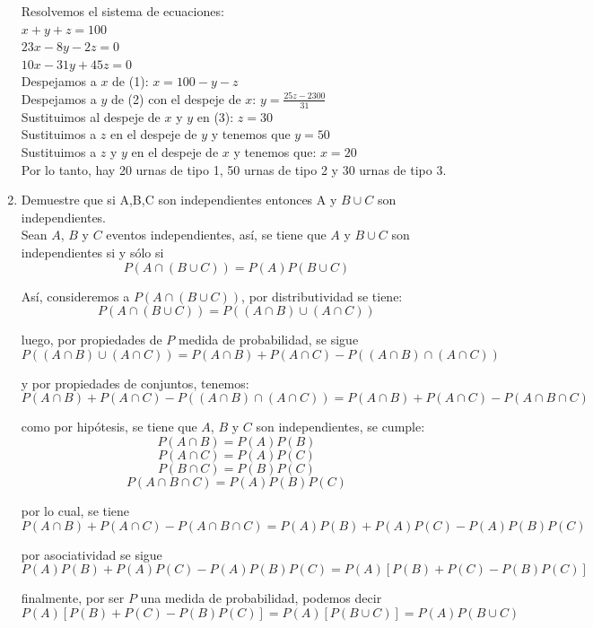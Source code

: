 \documentclass[12pt,a4paper]{report}
\begin{document}
\begin{enumerate}
{Resolvemos el sistema de ecuaciones:\\
$x + y + z = 100$\\
$23x -8y-2z = 0$\\
$10x -31y +45z = 0$\\

Despejamos a $x$ de (1): $ x = 100 -y -z$\\
Despejamos a $y$ de (2) con el despeje de $x$: $ y = \frac{25z -2300}{31}$\\
Sustituimos al despeje de $x$ y $y$ en (3): $z = 30$\\
Sustituimos a $z$ en el despeje de $y$ y tenemos que $y = 50$\\
Sustituimos a $z$ y $y$ en el despeje de $x$ y tenemos que: $x = 20$\\

Por lo tanto, hay 20 urnas de tipo 1, 50 urnas de tipo 2 y 30 urnas de tipo 3.\\

	}

   \item {
   Demuestre que si A,B,C son independientes entonces A y $B\cup C$ son independientes.\\
    Sean $A$, $B$ y  $C$ eventos independientes, así, se tiene que $A$ y $B \cup C$
	son independientes si y sólo si
		$$ P(A\cap(B \cup C)) = P(A)P(B \cup C) $$

	Así, consideremos a $ P(A\cap(B \cup C)) $, por distributividad
	se tiene:
		$$ P(A\cap(B \cup C)) = P((A \cap B) \cup (A \cap C)) $$

	luego, por propiedades de $P$ medida de probabilidad, se sigue
		$$ P((A \cap B) \cup (A \cap C)) = P(A \cap B) + P(A \cap C) - P((A \cap B) \cap (A \cap C)) $$

	y por propiedades de conjuntos, tenemos:
		$$ P(A \cap B) + P(A \cap C) - P((A \cap B) \cap (A \cap C)) = P(A \cap B) + P(A \cap C) - P(A \cap B \cap C) $$

	como por hipótesis, se tiene que $A$, $B$ y $C$ son independientes, se cumple:
		$$ P(A \cap B) = P(A)P(B) $$
		$$ P(A \cap C) = P(A)P(C) $$
		$$ P(B \cap C) = P(B)P(C) $$
		$$ P(A \cap B \cap C) = P(A)P(B)P(C) $$

	por lo cual, se tiene
		$$ P(A \cap B) + P(A \cap C) - P(A \cap B \cap C) = P(A)P(B) + P(A)P(C) - P(A)P(B)P(C) $$

	por asociatividad se sigue
		$$ P(A)P(B) + P(A)P(C) - P(A)P(B)P(C) = P(A)[P(B) + P(C) - P(B)P(C)] $$

	finalmente, por ser $P$ una medida de probabilidad, podemos decir
		$$ P(A)[P(B) + P(C) - P(B)P(C)] = P(A)[P(B \cup C)] = P(A)P(B \cup C) $$

}
\end{enumerate}
\end{document}
